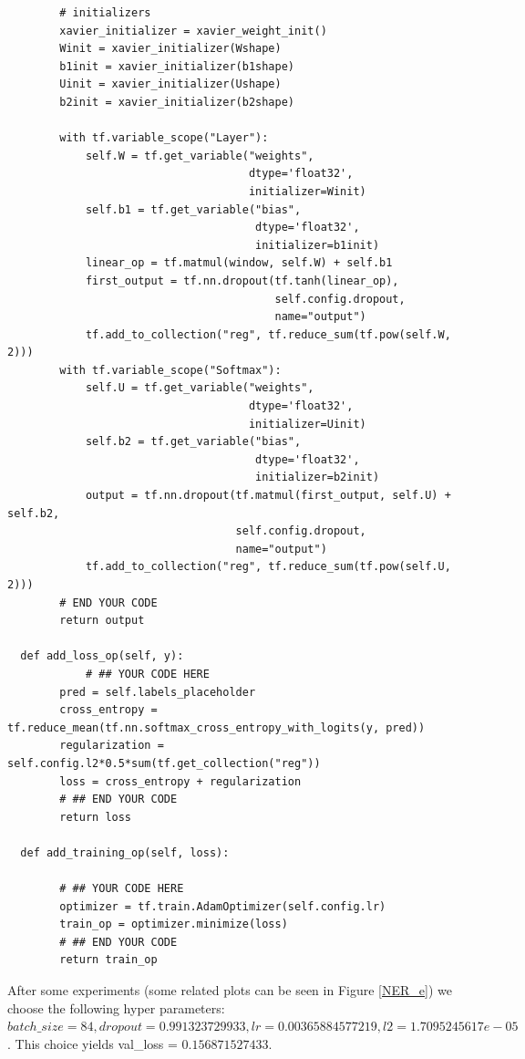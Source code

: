 \documentclass{article}
\begin{document}
\begin{verbatim}
        # initializers
        xavier_initializer = xavier_weight_init()
        Winit = xavier_initializer(Wshape)
        b1init = xavier_initializer(b1shape)
        Uinit = xavier_initializer(Ushape)
        b2init = xavier_initializer(b2shape)

        with tf.variable_scope("Layer"):
            self.W = tf.get_variable("weights",
                                     dtype='float32',
                                     initializer=Winit)
            self.b1 = tf.get_variable("bias",
                                      dtype='float32',
                                      initializer=b1init)
            linear_op = tf.matmul(window, self.W) + self.b1
            first_output = tf.nn.dropout(tf.tanh(linear_op),
                                         self.config.dropout,
                                         name="output")
            tf.add_to_collection("reg", tf.reduce_sum(tf.pow(self.W, 2)))
        with tf.variable_scope("Softmax"):
            self.U = tf.get_variable("weights",
                                     dtype='float32',
                                     initializer=Uinit)
            self.b2 = tf.get_variable("bias",
                                      dtype='float32',
                                      initializer=b2init)
            output = tf.nn.dropout(tf.matmul(first_output, self.U) + self.b2,
                                   self.config.dropout,
                                   name="output")
            tf.add_to_collection("reg", tf.reduce_sum(tf.pow(self.U, 2)))
        # END YOUR CODE
        return output
        
  def add_loss_op(self, y):
            # ## YOUR CODE HERE
        pred = self.labels_placeholder
        cross_entropy = tf.reduce_mean(tf.nn.softmax_cross_entropy_with_logits(y, pred))
        regularization = self.config.l2*0.5*sum(tf.get_collection("reg"))
        loss = cross_entropy + regularization
        # ## END YOUR CODE
        return loss
        
  def add_training_op(self, loss):
     
        # ## YOUR CODE HERE
        optimizer = tf.train.AdamOptimizer(self.config.lr)
        train_op = optimizer.minimize(loss)
        # ## END YOUR CODE
        return train_op
\end{verbatim}

After some experiments (some related plots can be seen in Figure \ref{NER_e}) we choose the following hyper parameters: $ batch\_size=84, dropout=0.991323729933, lr=0.00365884577219, l2=1.7095245617e-05$. This choice yields val\_loss = $0.156871527433$.
\end{document}

